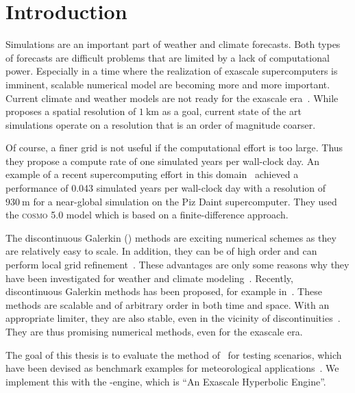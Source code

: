 \chapter{Introduction}\label{chap:introduction}
Simulations are an important part of weather and climate forecasts.
Both types of forecasts are difficult problems that are limited by a lack of computational power.
Especially in a time where the realization of exascale supercomputers is imminent, scalable numerical model are becoming more and more important.
Current climate and weather models are not ready for the exascale era~\cite{schulthess2018reflecting}.
While~\cite{schulthess2018reflecting} proposes a spatial resolution of $\SI{1}{\kilo\meter}$ as a goal, current state of the art simulations operate on a resolution that is an order of magnitude coarser.

Of course, a finer grid is not useful if the computational effort is too large.
Thus they propose a compute rate of one simulated years per wall-clock day.
An example of a recent supercomputing effort in this domain~\cite{fuhrer2018near} achieved a performance of 0.043 simulated years per wall-clock day with a resolution of $\SI{930}{\m}$ for a near-global simulation on the Piz Daint supercomputer.
They used the \textsc{cosmo} 5.0 model which is based on a finite-difference approach.

The discontinuous Galerkin (\dg{}) methods are exciting numerical schemes as they are relatively easy to scale.
In addition, they can be of high order and can perform local grid refinement~\cite{hesthaven2008nodal}.
These advantages are only some reasons why they have been investigated for weather and climate modeling~\cite{muller2010adaptive,giraldo2008study}.
Recently, \ader{} discontinuous Galerkin methods has been proposed, for example in~\cite{dumbser2008unified}.
These methods are scalable and of arbitrary order in both time and space.
With an appropriate limiter, they are also stable, even in the vicinity of discontinuities~\cite{dumbser2016simple}.
They are thus promising numerical methods, even for the exascale era.

The goal of this thesis is to evaluate the \aderdg{} method of~\cite{dumbser2008unified} for testing scenarios, which have been devised as benchmark examples for meteorological applications~\cite{robert1993bubble,giraldo2008study}.
We implement this with the \exahype{}-engine, which is \enquote{An Exascale Hyperbolic \pde{} Engine}.

